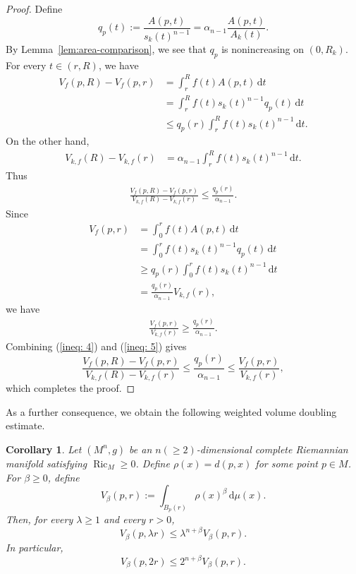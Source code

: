 \documentclass[11pt]{article}
\newtheorem{corollary}[theorem]{Corollary}
\newcommand{\Ric}{\operatorname{Ric}}
\newcommand{\dd}{\,\mathrm{d}}
\begin{document}
\begin{proof}
Define
$$
q_p(t):=\frac{A(p,t)}{s_k(t)^{n-1}}
=
\alpha_{n-1}\frac{A(p,t)}{A_k(t)}.
$$
By Lemma~\ref{lem:area-comparison}, we see that $q_p$ is nonincreasing on $(0,R_k)$. For every $t\in(r,R)$, we have
\begin{align*}
V_f(p,R)-V_f(p,r)
&=
\int_r^R f(t)A(p,t)\dd t\\
&=
\int_r^R f(t)s_k(t)^{n-1}q_p(t)\dd t\\
&\leq
q_p(r)\int_r^R f(t)s_k(t)^{n-1}\dd t.
\end{align*}
On the other hand,
\begin{align*}
V_{k,f}(R)-V_{k,f}(r)
&=
\alpha_{n-1}
\int_r^R f(t)s_k(t)^{n-1}\dd t.
\end{align*}
Thus
\begin{align}
\frac{V_f(p,R)-V_f(p,r)}{V_{k,f}(R)-V_{k,f}(r)}\leq \frac{q_p(r)}{\alpha_{n-1}}. \label{ineq: 4}
\end{align}
Since
\begin{align*}
V_f(p,r)
&=
\int_0^r f(t)A(p,t)\dd t\\
&=
\int_0^r f(t)s_k(t)^{n-1}q_p(t)\dd t\\
&\geq
q_p(r)\int_0^r f(t)s_k(t)^{n-1}\dd t\\
&=
\frac{q_p(r)}{\alpha_{n-1}}V_{k,f}(r),
\end{align*}
we have
\begin{align}
\frac{V_f(p,r)}{V_{k,f}(r)} \geq \frac{q_p(r)}{\alpha_{n-1}}. \label{ineq: 5}
\end{align}
Combining (\ref{ineq: 4}) and (\ref{ineq: 5}) gives
$$
\frac{V_f(p,R)-V_f(p,r)}
{V_{k,f}(R)-V_{k,f}(r)}
\leq
\frac{q_p(r)}{\alpha_{n-1}}
\leq
\frac{V_f(p,r)}
{V_{k,f}(r)},
$$
which completes the proof.
\end{proof}



















As a further consequence, we obtain the following weighted volume doubling estimate.

\begin{corollary} \label{cor:weighted-doubling}
Let $(M^n,g)$ be an $n(\geq 2)$-dimensional complete Riemannian manifold satisfying $\Ric_M\geq0$. Define \(\rho(x)=d(p,x)\) for some point $p\in M$. For \(\beta\geq0\), define
\[
V_\beta(p,r) := \int_{B_p(r)}\rho(x)^\beta\dd\mu(x).
\]
Then, for every \(\lambda\geq1\) and every \(r>0\),
\[
V_\beta(p,\lambda r)
\leq
\lambda^{n+\beta}V_\beta(p,r).
\]
In particular,
\[
V_\beta(p,2r)
\leq
2^{n+\beta}V_\beta(p,r).
\]
\end{corollary}
\end{document}
